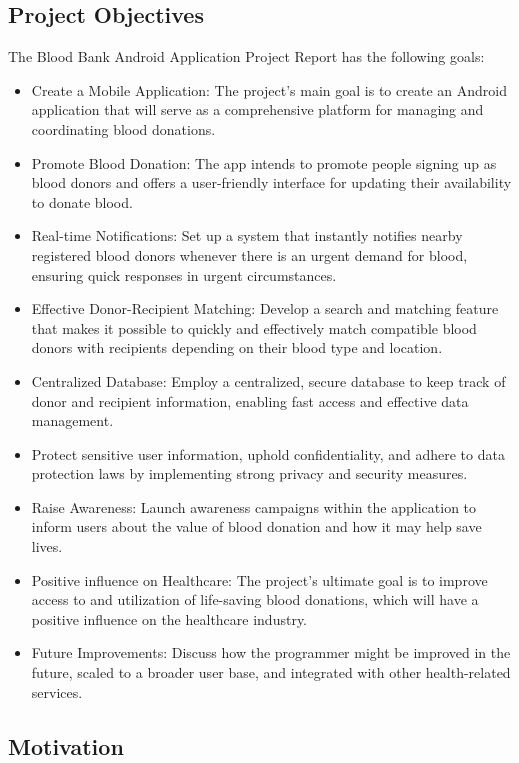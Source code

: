 \subsection{Project Objectives}
The Blood Bank Android Application Project Report has the following goals:
\begin{itemize}
    \item Create a Mobile Application: The project's main goal is to create an Android application that will serve as a comprehensive platform for managing and coordinating blood donations.
\item Promote Blood Donation: The app intends to promote people signing up as blood donors and
offers a user-friendly interface for updating their availability to donate blood.
\item Real-time Notifications: Set up a system that instantly notifies nearby registered blood donors
whenever there is an urgent demand for blood, ensuring quick responses in urgent circumstances.
\item Effective Donor-Recipient Matching: Develop a search and matching feature that makes it
possible to quickly and effectively match compatible blood donors with recipients depending on
their blood type and location.
\item Centralized Database: Employ a centralized, secure database to keep track of donor and recipient
information, enabling fast access and effective data management.
\item Protect sensitive user information, uphold confidentiality, and adhere to data protection laws by
implementing strong privacy and security measures.
\item Raise Awareness: Launch awareness campaigns within the application to inform users about the
value of blood donation and how it may help save lives.
\item Positive influence on Healthcare: The project's ultimate goal is to improve access to and utilization
of life-saving blood donations, which will have a positive influence on the healthcare industry.
\item Future Improvements: Discuss how the programmer might be improved in the future, scaled to a
broader user base, and integrated with other health-related services.
\end{itemize}
\subsection{Motivation}

